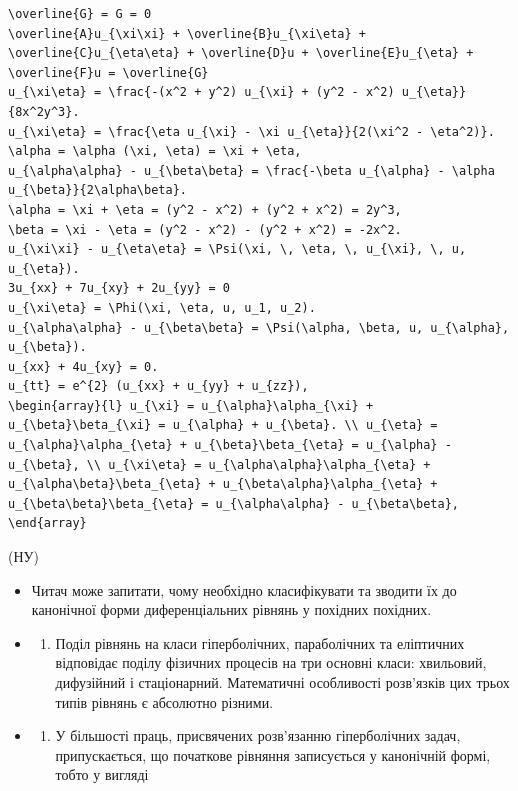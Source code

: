 \documentclass[
  ukrainian,
]{article}
\providecommand{\tightlist}{%
  \setlength{\itemsep}{0pt}\setlength{\parskip}{0pt}}
\begin{document}
\begin{verbatim}
\overline{G} = G = 0
\overline{A}u_{\xi\xi} + \overline{B}u_{\xi\eta} + \overline{C}u_{\eta\eta} + \overline{D}u + \overline{E}u_{\eta} + \overline{F}u = \overline{G}
u_{\xi\eta} = \frac{-(x^2 + y^2) u_{\xi} + (y^2 - x^2) u_{\eta}}{8x^2y^3}.
u_{\xi\eta} = \frac{\eta u_{\xi} - \xi u_{\eta}}{2(\xi^2 - \eta^2)}.
\alpha = \alpha (\xi, \eta) = \xi + \eta,
u_{\alpha\alpha} - u_{\beta\beta} = \frac{-\beta u_{\alpha} - \alpha u_{\beta}}{2\alpha\beta}.
\alpha = \xi + \eta = (y^2 - x^2) + (y^2 + x^2) = 2y^3,
\beta = \xi - \eta = (y^2 - x^2) - (y^2 + x^2) = -2x^2.
u_{\xi\xi} - u_{\eta\eta} = \Psi(\xi, \, \eta, \, u_{\xi}, \, u, u_{\eta}).
3u_{xx} + 7u_{xy} + 2u_{yy} = 0
u_{\xi\eta} = \Phi(\xi, \eta, u, u_1, u_2).
u_{\alpha\alpha} - u_{\beta\beta} = \Psi(\alpha, \beta, u, u_{\alpha}, u_{\beta}).
u_{xx} + 4u_{xy} = 0.
u_{tt} = e^{2} (u_{xx} + u_{yy} + u_{zz}),
\begin{array}{l} u_{\xi} = u_{\alpha}\alpha_{\xi} + u_{\beta}\beta_{\xi} = u_{\alpha} + u_{\beta}. \\ u_{\eta} = u_{\alpha}\alpha_{\eta} + u_{\beta}\beta_{\eta} = u_{\alpha} - u_{\beta}, \\ u_{\xi\eta} = u_{\alpha\alpha}\alpha_{\eta} + u_{\alpha\beta}\beta_{\eta} + u_{\beta\alpha}\alpha_{\eta} + u_{\beta\beta}\beta_{\eta} = u_{\alpha\alpha} - u_{\beta\beta}, \end{array}
\end{verbatim}

(НУ)

\begin{itemize}
\tightlist
\item
  Читач може запитати, чому необхідно класифікувати та зводити їх до
  канонічної форми диференціальних рівнянь у похідних похідних.
\item
  \begin{enumerate}
  \def\labelenumi{\alph{enumi})}
  \tightlist
  \item
    Поділ рівнянь на класи гіперболічних, параболічних та еліптичних
    відповідає поділу фізичних процесів на три основні класи: хвильовий,
    дифузійний і стаціонарний. Математичні особливості розв'язків цих
    трьох типів рівнянь є абсолютно різними.
  \end{enumerate}
\item
  \begin{enumerate}
  \def\labelenumi{\alph{enumi})}
  \setcounter{enumi}{1}
  \tightlist
  \item
    У більшості праць, присвячених розв'язанню гіперболічних задач,
    припускається, що початкове рівняння записується у канонічній формі,
    тобто у вигляді
  \end{enumerate}
\end{itemize}
\end{document}
